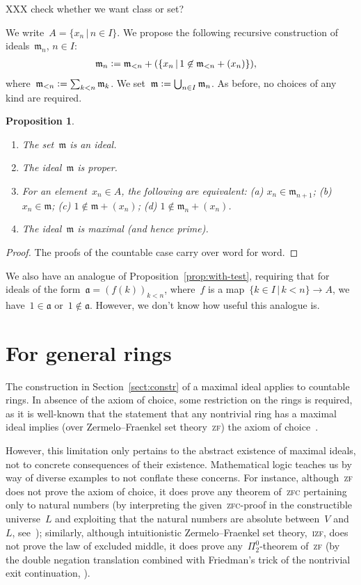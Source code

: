 \documentclass[oneside,reqno]{amsart}
\theoremstyle{definition}
\theoremstyle{plain}
\newtheorem{prop}[defn]{Proposition}
\theoremstyle{remark}
\newcommand{\aaa}{\mathfrak{a}}
\newcommand{\mmm}{\mathfrak{m}}
\newcommand{\defeq}{\vcentcolon=}
\renewcommand{\_}{\mathpunct{.}\,}
\begin{document}
XXX check whether we want class or set?

We write~$A = \{ x_n \,|\, n \in I \}$.
We propose the following recursive construction of ideals~$\mmm_n$, $n \in I$:
\begin{align*}
  \mmm_n &\defeq \mmm_{<n} + (\{ x_n \,|\, 1 \not\in \mmm_{<n} + (x_n) \}),
\end{align*}
where~$\mmm_{<n} \defeq \sum_{k < n} \mmm_k$. We set~$\mmm \defeq \bigcup_{n
\in I} \mmm_n$. As before, no choices of any kind are required.

\begin{prop}\begin{enumerate}
\item The set~$\mmm$ is an ideal.
\item The ideal~$\mmm$ is proper.
\item For an element~$x_n \in A$, the following are equivalent: (a) $x_n \in
\mmm_{n+1}$; (b) $x_n \in \mmm$; (c) $1 \not\in \mmm + (x_n)$; (d) $1 \not \in \mmm_n + (x_n)$.
\item The ideal~$\mmm$ is maximal (and hence prime).
\end{enumerate}
\end{prop}

\begin{proof}The proofs of the countable case carry over word for word.
\end{proof}

We also have an analogue of Proposition~\ref{prop:with-test}, requiring that
for ideals of the form~$\aaa = (f(k))_{k < n}$, where~$f$ is a map~$\{ k \in I
\,|\, k < n \} \to A$, we have~$1 \in \aaa$ or~$1 \not\in \aaa$. However, we
don't know how useful this analogue is.


\section{For general rings}

The construction in Section~\ref{sect:constr} of a maximal ideal applies to
countable rings. In absence of the axiom of choice, some restriction on the
rings is required, as it is well-known that the statement that any nontrivial
ring has a maximal ideal implies (over Zermelo--Fraenkel set
theory~\textsc{zf}) the axiom of choice~\cite{hodges:krull,banaschewski:krull,erne:krull}.

However, this limitation only pertains to the abstract existence of maximal
ideals, not to concrete consequences of their existence. Mathematical
logic teaches us by way of diverse examples to not conflate these concerns. For
instance, although~\textsc{zf} does not prove the axiom of choice, it does
prove any theorem of~\textsc{zfc} pertaining only to natural numbers (by
interpreting the given~\textsc{zfc}-proof in the constructible universe~$L$
and exploiting that the natural numbers are absolute between~$V$ and~$L$,
see~\cite{???}); similarly, although intuitionistic Zermelo--Fraenkel set
theory,~\textsc{izf}, does not prove the law of excluded middle, it does prove
any~$\Pi^0_2$-theorem of~\textsc{zf} (by the double negation translation
combined with Friedman's trick of the nontrivial exit continuation,
\cite{???}).
\end{document}

